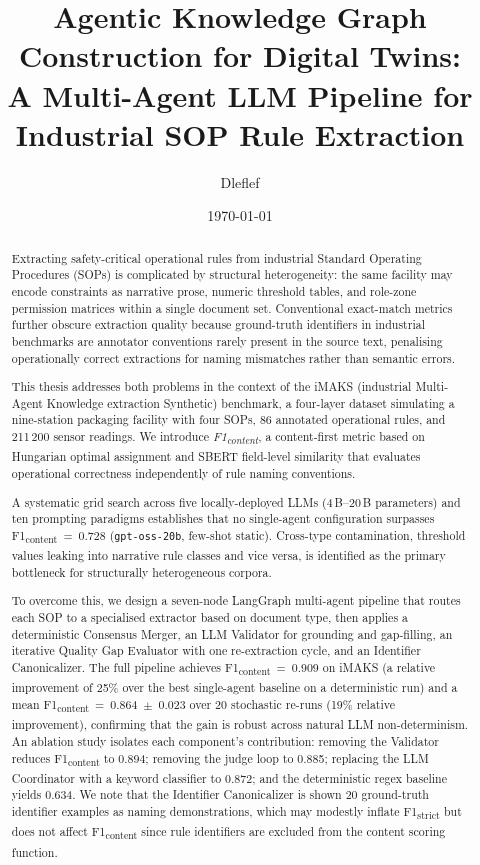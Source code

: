 ﻿\documentclass[11pt]{article}
\title{\textbf{Agentic Knowledge Graph Construction for Digital Twins:\\
A Multi-Agent LLM Pipeline for Industrial SOP Rule Extraction}}
\author{Dleflef}
\date{\today}
\begin{document}
\maketitle

\begin{abstract}
Extracting safety-critical operational rules from industrial Standard Operating
Procedures (SOPs) is complicated by structural heterogeneity: the same facility may
encode constraints as narrative prose, numeric threshold tables, and role-zone
permission matrices within a single document set.
Conventional exact-match metrics further obscure extraction quality because
ground-truth identifiers in industrial benchmarks are annotator conventions
rarely present in the source text, penalising operationally correct extractions
for naming mismatches rather than semantic errors.

This thesis addresses both problems in the context of the iMAKS
(industrial Multi-Agent Knowledge extraction Synthetic) benchmark, a four-layer
dataset simulating a nine-station packaging facility with four SOPs, 86 annotated
operational rules, and 211\,200 sensor readings.
We introduce \emph{F1\textsubscript{content}}, a content-first metric based on
Hungarian optimal assignment and SBERT field-level similarity that evaluates
operational correctness independently of rule naming conventions.

A systematic grid search across five locally-deployed LLMs (4\,B--20\,B parameters)
and ten prompting paradigms establishes that no single-agent configuration surpasses
F1\textsubscript{content}~=~0.728 (\texttt{gpt-oss-20b}, few-shot static).
Cross-type contamination, threshold values leaking into narrative rule classes and
vice versa, is identified as the primary bottleneck for structurally heterogeneous
corpora.

To overcome this, we design a seven-node LangGraph multi-agent pipeline that routes
each SOP to a specialised extractor based on document type, then applies a
deterministic Consensus Merger, an LLM Validator for grounding and gap-filling,
an iterative Quality Gap Evaluator with one re-extraction cycle, and an Identifier
Canonicalizer.
The full pipeline achieves F1\textsubscript{content}~=~0.909 on iMAKS
(a relative improvement of 25\% over the best single-agent baseline on a
deterministic run) and a mean F1\textsubscript{content}~=~0.864~$\pm$~0.023
over 20 stochastic re-runs (19\% relative improvement), confirming that the
gain is robust across natural LLM non-determinism.
An ablation study isolates each component's contribution: removing the Validator
reduces F1\textsubscript{content} to 0.894; removing the judge loop to 0.885;
replacing the LLM Coordinator with a keyword classifier to 0.872; and the
deterministic regex baseline yields 0.634.
We note that the Identifier Canonicalizer is shown 20 ground-truth identifier
examples as naming demonstrations, which may modestly inflate F1\textsubscript{strict}
but does not affect F1\textsubscript{content} since rule identifiers are excluded
from the content scoring function.


\end{abstract}
\end{document}

